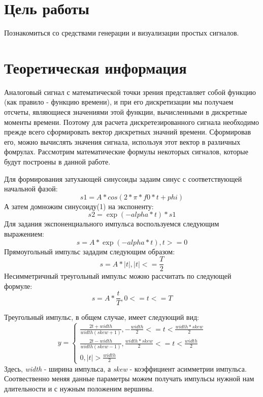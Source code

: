 
\usepackage{amsmath}







\section{Цель работы}
Познакомиться со средствами генерации и визуализации простых сигналов.


\section{Теоретическая информация}
Аналоговый сигнал с математической точки зрения представляет собой функцию (как правило - функцию времени), и при его дискретизации мы получаем отсчеты, являющиеся значениями этой функции, вычисленными в дискретные моменты времени. Поэтому для расчета дискретезированного сигнала необходимо прежде всего сформировать вектор дискретных значний времени. Сформировав его, можно вычислять значения сигнала, используя этот вектор в различных фомрулах.
Рассмотрим математические формулы некоторых сигналов, которые будут построены в данной работе.


 Для формирования затухающей синусоиды задаим синус с соответствующей начальной фазой:
\begin{equation} s1 = A * cos(2  * \pi * f0 * t + phi) \end{equation}
А затем домножим синусоиду(1) на экспоненту:
\begin{equation} s2 = \exp(-alpha * t) * s1 \end{equation}
Для задания экспоненциального импульса воспользуемся следующим выражением:
\begin{equation} s = A * \exp(-alpha * t) , t >=0 \end{equation}
Прямоугольный импульс зададим следующим образом:
\begin{equation} s = A *  |t|,  |t| <= \frac{T}{2}  \end{equation}
Несимметричный треугольный импульс можно рассчитать по следующей формуле:
\begin{equation} s = A * \frac{t}{T}, 0 <= t <= T \end{equation}

Треугольный импульс, в общем случае, имеет следующий вид:
\begin{equation*}
y = 
 \begin{cases}
   \frac{2t + width}{width(skew + 1)}, -\frac{width}{2} <= t < \frac{width * skew}{2}\\
   \frac{2t - width}{width(skew - 1)} , \frac{width * skew}{2} <= t < \frac{width}{2}\\
    0, |t| > \frac{width}{2}
 \end{cases}
\end{equation*}
Здесь, \textit{width} - ширина импульса, а \textit{skew} - коэффициент асимметрии импульса. Соотвественно меняя данные параметры можем получать импульсы нужной нам длительности и с нужным положеним вершины.

